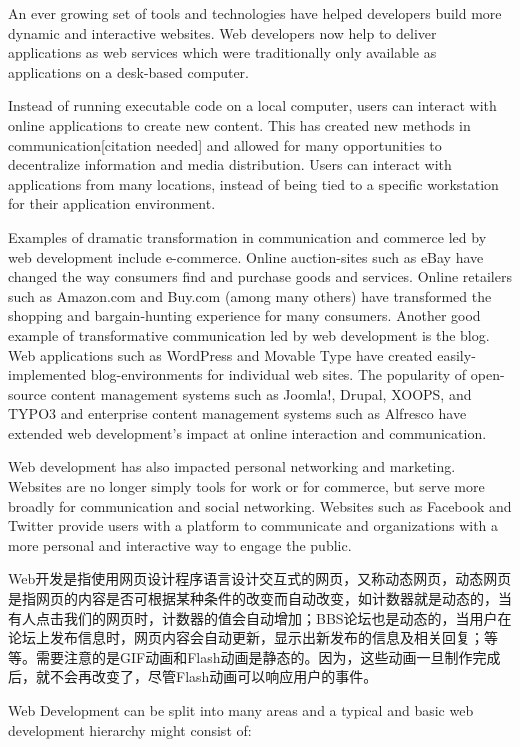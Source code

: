 An ever growing set of tools and technologies have helped developers build more dynamic and interactive websites. Web developers now help to deliver applications as web services which were traditionally only available as applications on a desk-based computer.

Instead of running executable code on a local computer, users can interact with online applications to create new content. This has created new methods in communication[citation needed] and allowed for many opportunities to decentralize information and media distribution. Users can interact with applications from many locations, instead of being tied to a specific workstation for their application environment.

Examples of dramatic transformation in communication and commerce led by web development include e-commerce. Online auction-sites such as eBay have changed the way consumers find and purchase goods and services. Online retailers such as Amazon.com and Buy.com (among many others) have transformed the shopping and bargain-hunting experience for many consumers. Another good example of transformative communication led by web development is the blog. Web applications such as WordPress and Movable Type have created easily-implemented blog-environments for individual web sites. The popularity of open-source content management systems such as Joomla!, Drupal, XOOPS, and TYPO3 and enterprise content management systems such as Alfresco have extended web development's impact at online interaction and communication.

Web development has also impacted personal networking and marketing. Websites are no longer simply tools for work or for commerce, but serve more broadly for communication and social networking. Websites such as Facebook and Twitter provide users with a platform to communicate and organizations with a more personal and interactive way to engage the public.

Web开发是指使用网页设计程序语言设计交互式的网页，又称动态网页，动态网页是指网页的内容是否可根据某种条件的改变而自动改变，如计数器就是动态的，当有人点击我们的网页时，计数器的值会自动增加；BBS论坛也是动态的，当用户在论坛上发布信息时，网页内容会自动更新，显示出新发布的信息及相关回复；等等。需要注意的是GIF动画和Flash动画是静态的。因为，这些动画一旦制作完成后，就不会再改变了，尽管Flash动画可以响应用户的事件。


Web Development can be split into many areas and a typical and basic web development hierarchy might consist of:

